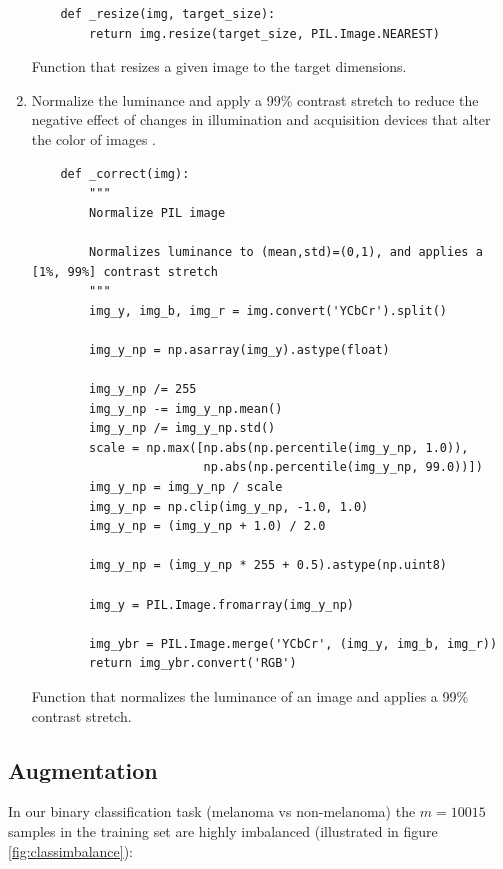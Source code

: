 \begin{enumerate}
    \begin{listing}[ht]
    \begin{verbatim}
    def _resize(img, target_size):
        return img.resize(target_size, PIL.Image.NEAREST)
    \end{verbatim}
    \caption{Function that resizes a given image to the target dimensions.}
    \label{code:resize}
    \end{listing}

    \item Normalize the luminance and apply a 99\% contrast stretch to reduce the negative effect of changes in illumination and acquisition devices that alter the color of images \cite{colorconstancy}.

    \begin{listing}[ht]
    \begin{verbatim}
    def _correct(img):
        """
        Normalize PIL image

        Normalizes luminance to (mean,std)=(0,1), and applies a [1%, 99%] contrast stretch
        """
        img_y, img_b, img_r = img.convert('YCbCr').split()

        img_y_np = np.asarray(img_y).astype(float)

        img_y_np /= 255
        img_y_np -= img_y_np.mean()
        img_y_np /= img_y_np.std()
        scale = np.max([np.abs(np.percentile(img_y_np, 1.0)),
                        np.abs(np.percentile(img_y_np, 99.0))])
        img_y_np = img_y_np / scale
        img_y_np = np.clip(img_y_np, -1.0, 1.0)
        img_y_np = (img_y_np + 1.0) / 2.0

        img_y_np = (img_y_np * 255 + 0.5).astype(np.uint8)

        img_y = PIL.Image.fromarray(img_y_np)

        img_ybr = PIL.Image.merge('YCbCr', (img_y, img_b, img_r))
        return img_ybr.convert('RGB')
    \end{verbatim}
    \caption{Function that normalizes the luminance of an image and applies a 99\% contrast stretch.}
    \label{code:correct}
    \end{listing}
\end{enumerate}

\subsection{Augmentation}
\label{subsection:augmentation}

In our binary classification task (melanoma vs non-melanoma) the $m = 10015$ samples in the training set are highly imbalanced (illustrated in figure \ref{fig:classimbalance}):

